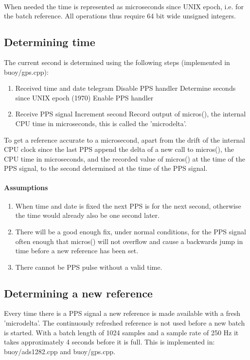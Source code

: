 \documentclass[a4paper]{article}
\begin{document}
\begin{multicols}{2}
  \paragraph{}When needed the time is represented as microseconds since
  UNIX epoch, i.e. for the batch reference. All operations thus require
  64 bit wide unsigned integers.

  \subsection{Determining time}
  The current second is determined using the following steps
  (implemented in buoy/gps.cpp):

  \begin{enumerate}
    \item Received time and date telegram
      \subitem Disable PPS handler
      \subitem Determine seconds since UNIX epoch (1970)
      \subitem Enable PPS handler
    \item Receive PPS signal
      \subitem Increment second
      \subitem Record output of micros(), the internal CPU time in
      microseconds, this is called the 'microdelta'.
  \end{enumerate}

  To get a reference accurate to a microsecond, apart from the drift
  of the internal CPU clock since the last PPS append the delta of a new
  call to micros(), the CPU time in microseconds, and the recorded value
  of micros() at the time of the PPS signal, to the second determined at
  the time of the PPS signal.

  \paragraph{Assumptions}
  \begin{enumerate}
    \item When time and date is fixed the next PPS is for the next
      second, otherwise the time would already also be one second
      later.
    \item There will be a good enough fix, under normal conditions, for
      the PPS signal often enough that micros() will not overflow and
      cause a backwards jump in time before a new reference has been set.
    \item There cannot be PPS pulse without a valid time.
  \end{enumerate}

  \subsection{Determining a new reference}
  Every time there is a PPS signal a
  new reference is made available with a fresh 'microdelta'. The
  continuously refreshed reference is not used before a new batch is
  started. With a batch length of 1024 samples and a sample rate of 250
  Hz it takes approximately 4 seconds before it is full. This is
  implemented in: buoy/ads1282.cpp and buoy/gps.cpp.


\end{multicols}
\end{document}
